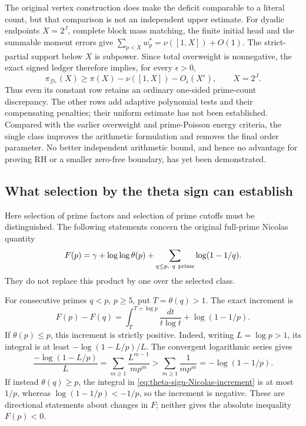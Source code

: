 \documentclass[11pt]{article}
\theoremstyle{definition}
\begin{document}
The original vertex construction does make the deficit
comparable to a literal count, but that comparison is not an
independent upper estimate. For dyadic endpoints $X=2^J$,
complete block mass matching, the finite initial head and the
summable moment errors give
$\sum_{p<X}w_p^*=\nu([1,X])+O(1)$.
The strict-partial support below $X$ is subpower.
Since total overweight is nonnegative, the exact signed ledger
therefore implies, for every $\epsilon>0$,
\[
 \pi_{\mathcal D_*}(X)
       \ge \pi(X)-\nu([1,X])-O_\epsilon(X^\epsilon),
                       \qquad X=2^J .
\]
Thus even its constant row retains an ordinary one-sided
prime-count discrepancy. The other rows add adaptive polynomial
tests and their compensating penalties; their uniform estimate
has not been established.
Compared with the earlier overweight and prime-Poisson energy
criteria, the single class improves the arithmetic formulation
and removes the final order parameter. No better independent
arithmetic bound, and hence no advantage for proving RH or a
smaller zero-free boundary, has yet been demonstrated.

\subsection{What selection by the theta sign can establish}
\label{sec:theta-sign-prime-test}

Here selection of prime factors and selection of prime cutoffs
must be distinguished. The following statements concern the
original full-prime Nicolas quantity
\[
 F(p)=\gamma+\log\log\theta(p)
                  +\sum_{q\le p,\ q\ {\rm prime}}\log(1-1/q).
\]
They do not replace this product by one over the selected class.

For consecutive primes $q<p$, $p\ge5$, put $T=\theta(q)>1$.
The exact increment is
\begin{equation}
 F(p)-F(q)=\int_T^{T+\log p}\frac{dt}{t\log t}
                                      +\log(1-1/p).
 \label{eq:theta-sign-Nicolas-increment}
\end{equation}
If $\theta(p)\le p$, this increment is strictly positive.
Indeed, writing $L=\log p>1$, its integral is at least
$-\log(1-L/p)/L$. The convergent logarithmic series gives
\[
 \frac{-\log(1-L/p)}L
 =\sum_{m\ge1}\frac{L^{m-1}}{mp^m}
 >\sum_{m\ge1}\frac1{mp^m}=-\log(1-1/p).
\]
If instead $\theta(q)\ge p$, the integral in
\eqref{eq:theta-sign-Nicolas-increment} is at most $1/p$,
whereas $\log(1-1/p)<-1/p$, so the increment is negative.
These are directional statements about changes in $F$;
neither gives the absolute inequality $F(p)<0$.
\end{document}
